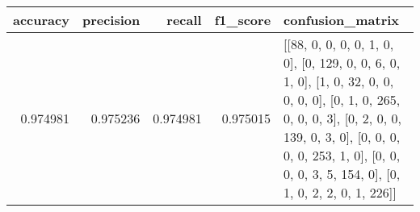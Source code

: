 \begin{tabular}{rrrrl}
\toprule
accuracy & precision & recall & f1_score & confusion_matrix \\
\midrule
0.974981 & 0.975236 & 0.974981 & 0.975015 & [[88, 0, 0, 0, 0, 1, 0, 0], [0, 129, 0, 0, 6, 0, 1, 0], [1, 0, 32, 0, 0, 0, 0, 0], [0, 1, 0, 265, 0, 0, 0, 3], [0, 2, 0, 0, 139, 0, 3, 0], [0, 0, 0, 0, 0, 253, 1, 0], [0, 0, 0, 0, 3, 5, 154, 0], [0, 1, 0, 2, 2, 0, 1, 226]] \\
\bottomrule
\end{tabular}
